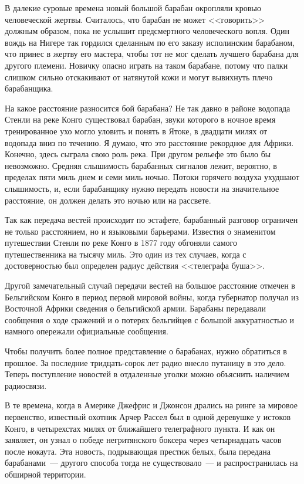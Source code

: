 \documentclass[12pt,a4paper,twoside,openany,svgnames]{memoir}
\begin{document}
В далекие суровые времена новый большой барабан окропляли кровью человеческой жертвы. Считалось, что барабан не может <<говорить>> должным образом, пока не услышит предсмертного человеческого вопля. Один вождь на Нигере так гордился сделанным по его заказу исполинским барабаном, что принес в жертву его мастера, чтобы тот не мог сделать лучшего барабана для другого племени. Новичку опасно играть на таком барабане, потому что палки слишком сильно отскакивают от натянутой кожи и могут вывихнуть плечо барабанщика.

На какое расстояние разносится бой барабана? Не так давно в районе водопада Стенли на реке Конго существовал барабан, звуки которого в ночное время тренированное ухо могло уловить и понять в Ятоке, в двадцати милях от водопада вниз по течению. Я думаю, что это расстояние рекордное для Африки. Конечно, здесь сыграла свою роль река. При другом рельефе это было бы невозможно. Средняя слышимость барабанных сигналов лежит, вероятно, в пределах пяти миль днем и семи миль ночью. Потоки горячего воздуха ухудшают слышимость, и, если барабанщику нужно передать новости на значительное расстояние, он должен делать это ночью или на рассвете.

Так как передача вестей происходит по эстафете, барабанный разговор ограничен не только расстоянием, но и языковыми барьерами. Известия о знаменитом путешествии Стенли по реке Конго в 1877 году обгоняли самого путешественника на тысячу миль. Это один из тех случаев, когда с достоверностью был определен радиус действия <<телеграфа буша>>.

Другой замечательный случай передачи вестей на большое расстояние отмечен в Бельгийском Конго в период первой мировой войны, когда губернатор получал из Восточной Африки сведения о бельгийской армии. Барабаны передавали сообщения о ходе сражений и о потерях бельгийцев с большой аккуратностью и намного опережали официальные сообщения.

Чтобы получить более полное представление о барабанах, нужно обратиться в прошлое. За последние тридцать-сорок лет радио внесло путаницу в это дело. Теперь поступление новостей в отдаленные уголки можно объяснить наличием радиосвязи.

В те времена, когда в Америке Джефрис и Джонсон дрались на ринге за мировое первенство, известный охотник Арчер Рассел был в одной деревушке у истоков Конго, в четырехстах милях от ближайшего телеграфного пункта. И как он заявляет, он узнал о победе негритянского боксера через четырнадцать часов после нокаута. Эта новость, подрывающая престиж белых, была передана барабанами~--- другого способа тогда не существовало~--- и распространилась на обширной территории.
\end{document}
